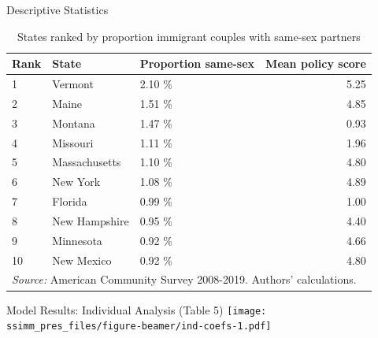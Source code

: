 \documentclass[
  ignorenonframetext,
]{beamer}
\begin{document}
\begin{frame}{Descriptive Statistics}
\protect\hypertarget{descriptive-statistics-6}{}
\begin{table}

\caption{\label{tab:state-tab}States ranked by proportion immigrant couples with same-sex partners}
\centering
\fontsize{9}{11}\selectfont
\begin{tabular}[t]{lllr}
\toprule
Rank & State & Proportion same-sex & Mean policy score\\
\midrule
1 & Vermont & 2.10 \% & 5.25\\
2 & Maine & 1.51 \% & 4.85\\
3 & Montana & 1.47 \% & 0.93\\
4 & Missouri & 1.11 \% & 1.96\\
5 & Massachusetts & 1.10 \% & 4.80\\
6 & New York & 1.08 \% & 4.89\\
7 & Florida & 0.99 \% & 1.00\\
8 & New Hampshire & 0.95 \% & 4.40\\
9 & Minnesota & 0.92 \% & 4.66\\
10 & New Mexico & 0.92 \% & 4.80\\
\bottomrule
\multicolumn{4}{l}{\rule{0pt}{1em}\textit{Source:} American Community Survey 2008-2019. Authors' calculations.}\\
\end{tabular}
\end{table}
\end{frame}

\begin{frame}{Model Results: Individual Analysis (Table 5)}
\protect\hypertarget{model-results-individual-analysis-table-5}{}
\texttt{[image: ssimm\_pres\_files/figure-beamer/ind-coefs-1.pdf]}
\end{frame}
\end{document}
